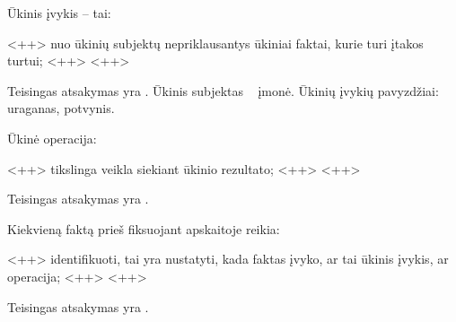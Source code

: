 \begin{tasks}
  \begin{task}
    \begin{condition}
      Ūkinis įvykis – tai:
      \begin{enumerate}
         <++>
         nuo ūkinių subjektų nepriklausantys ūkiniai faktai,
          kurie turi įtakos turtui;
         <++>
         <++>
      \end{enumerate}
    \end{condition}
    \begin{solution}
      Teisingas atsakymas yra . Ūkinis subjektas ~ įmonė.
      Ūkinių įvykių pavyzdžiai: uraganas, potvynis.
    \end{solution}
  \end{task}

  \begin{task}
    \begin{condition}
      Ūkinė operacija:
      \begin{enumerate}
         <++>
         tikslinga veikla siekiant ūkinio rezultato;
         <++>
         <++>
      \end{enumerate}
    \end{condition}
    \begin{solution}
      Teisingas atsakymas yra .
    \end{solution}
  \end{task}

  \begin{task}
    \begin{condition}
      Kiekvieną faktą prieš fiksuojant apskaitoje reikia:
      \begin{enumerate}
         <++>
         identifikuoti, tai yra nustatyti, kada faktas įvyko,
          ar tai ūkinis įvykis, ar operacija;
         <++>
         <++>
      \end{enumerate}
    \end{condition}
    \begin{solution}
      Teisingas atsakymas yra .
    \end{solution}
  \end{task}
  
\end{tasks}

